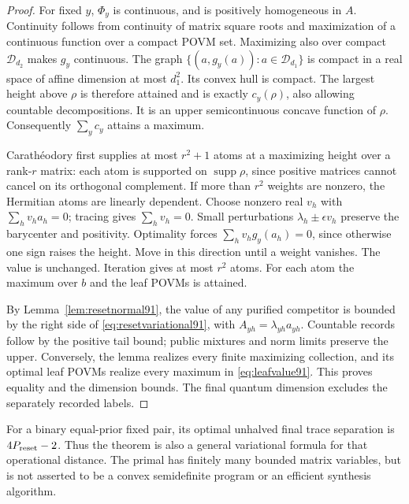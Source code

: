 \begin{proof}
For fixed $y$, $\Phi_y$ is continuous, and is positively homogeneous
in $A$.  Continuity follows from continuity of matrix square roots and
maximization of a continuous function over a compact POVM set.
Maximizing also over compact $\mathcal D_{d_2}$ makes $g_y$ continuous.
The graph $\{(a,g_y(a)):a\in\mathcal D_{d_1}\}$ is compact in a
real space of affine dimension at most $d_1^2$.  Its convex hull is
compact.  The largest height above $\rho$ is therefore attained and
is exactly $c_y(\rho)$, also allowing countable decompositions.
It is an upper semicontinuous concave function of $\rho$.
Consequently $\sum_yc_y$ attains a maximum.

Carath\'eodory first supplies at most $r^2+1$ atoms at a maximizing
height over a rank-$r$ matrix: each atom is supported on
$\operatorname{supp}\rho$, since positive matrices cannot cancel on its
orthogonal complement.  If more than $r^2$ weights are nonzero, the
Hermitian atoms are linearly dependent.  Choose nonzero real $v_h$ with
$\sum_hv_ha_h=0$; tracing gives $\sum_hv_h=0$.
Small perturbations $\lambda_h\pm\epsilon v_h$ preserve the barycenter
and positivity.  Optimality forces $\sum_hv_hg_y(a_h)=0$, since otherwise
one sign raises the height.  Move in this direction until a weight
vanishes.  The value is unchanged.  Iteration gives at most $r^2$ atoms.
For each atom the maximum over $b$ and the leaf POVMs is attained.

By Lemma~\ref{lem:resetnormal91}, the value of any purified competitor
is bounded by the right side of \eqref{eq:resetvariational91}, with
$A_{yh}=\lambda_{yh}a_{yh}$.  Countable records follow by the positive
tail bound; public mixtures and norm limits preserve the upper.
Conversely, the lemma realizes every finite maximizing collection,
and its optimal leaf POVMs realize every maximum in
\eqref{eq:leafvalue91}.  This proves equality and the dimension bounds.
The final quantum dimension excludes the separately recorded labels.
\end{proof}
For a binary equal-prior fixed pair, its optimal unhalved final trace
separation is $4P_{\rm reset}-2$.  Thus the theorem is also a general
variational formula for that operational distance.  The primal has
finitely many bounded matrix variables, but is not asserted to be a
convex semidefinite program or an efficient synthesis algorithm.


